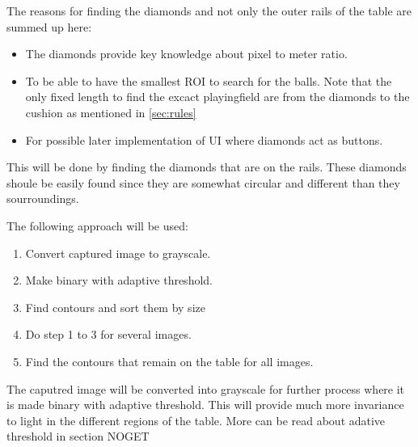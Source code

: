 The reasons for finding the diamonds and not only the outer rails of the table are summed up here:

\begin{itemize}
	\item The diamonds provide key knowledge about pixel to meter ratio.
	\item To be able to have the smallest ROI to search for the balls. Note that the only fixed length to find the excact playingfield are from the diamonds to the cushion as mentioned in \ref{sec:rules}
	\item For possible later implementation of UI where diamonds act as buttons.
\end{itemize}

This will be done by finding the diamonds that are on the rails. These diamonds shoule be easily found since they are somewhat circular and different than they sourroundings. 

The following approach will be used:
\begin{enumerate}
\item Convert captured image to grayscale.
\item Make binary with adaptive threshold.
\item Find contours and sort them by size
\item Do step 1 to 3 for several images.
\item Find the contours that remain on the table for all images.
\end{enumerate}

The caputred image will be converted into grayscale for further process where it is made binary with adaptive threshold. This will provide much more invariance to light in the different regions of the table. More can be read about adative threshold in section \LAV NOGET